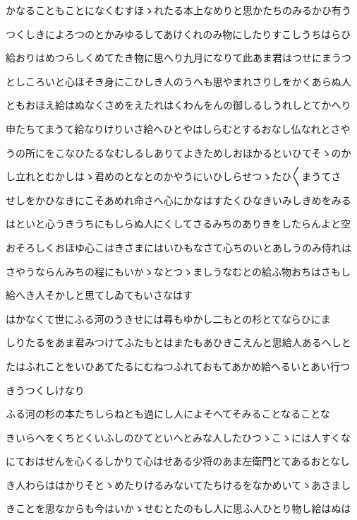 \documentclass[a4paper,11pt,landscape]{ltjtarticle}
\begin{document}
\par\medskip
かなることもことになくむすほゝれたる本上なめりと思かたちのみるかひ有う
\par\medskip
つくしきによろつのとかみゆるしてあけくれのみ物にしたりすこしうちはらひ
\par\medskip
給おりはめつらしくめてたき物に思へり九月になりて此あま君はつせにまうつ
\par\medskip
としころいと心ほそき身にこひしき人のうへも思やまれさりしをかくあらぬ人
\par\medskip
ともおほえ給はぬなくさめをえたれはくわんをんの御しるしうれしとてかへり
\par\medskip
申たちてまうて給なりけりいさ給へひとやはしらむとするおなし仏なれとさや
\par\medskip
うの所にをこなひたるなむしるしありてよきためしおほかるといひてそゝのか
\par\medskip
し立れとむかしはゝ君めのとなとのかやうにいひしらせつゝたひ〱まうてさ
\par\medskip
せしをかひなきにこそあめれ命さへ心にかなはすたくひなきいみしきめをみる
\par\medskip
はといと心うきうちにもしらぬ人にくしてさるみちのありきをしたらんよと空
\par\medskip
おそろしくおほゆ心こはきさまにはいひもなさて心ちのいとあしうのみ侍れは
\par\medskip
さやうならんみちの程にもいかゝなとつゝましうなむとの給ふ物おちはさもし
\par\medskip
給へき人そかしと思てしゐてもいさなはす
\par\medskip
はかなくて世にふる河のうきせには尋もゆかし二もとの杉とてならひにま
\par\medskip
しりたるをあま君みつけてふたもとはまたもあひきこえんと思給人あるへしと
\par\medskip
たはふれことをいひあてたるにむねつふれておもてあかめ給へるいとあい行つ
\par\medskip
きうつくしけなり
\par\medskip
ふる河の杉の本たちしらねとも過にし人によそへてそみることなることな
\par\medskip
きいらへをくちとくいふしのひてといへとみな人したひつゝこゝには人すくな
\par\medskip
にておはせんを心くるしかりて心はせある少将のあま左衛門とてあるおとなし
\par\medskip
き人わらははかりそとゝめたりけるみないてたちけるをなかめいてゝあさまし
\par\medskip
きことを思なからも今はいかゝせむとたのもし人に思ふ人ひとり物し給はぬは
\end{document}
